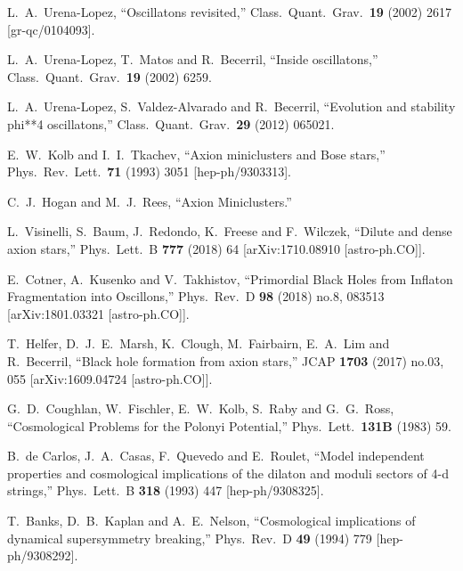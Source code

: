 \documentclass[11pt,a4paper]{article}
\begin{document}
\begin{thebibliography}{99}
  L.~A.~Urena-Lopez,
  ``Oscillatons revisited,''
  Class.\ Quant.\ Grav.\  {\bf 19} (2002) 2617
  [gr-qc/0104093].
  
  L.~A.~Urena-Lopez, T.~Matos and R.~Becerril,
  ``Inside oscillatons,''
  Class.\ Quant.\ Grav.\  {\bf 19} (2002) 6259.
  
  L.~A.~Urena-Lopez, S.~Valdez-Alvarado and R.~Becerril,
  ``Evolution and stability phi**4 oscillatons,''
  Class.\ Quant.\ Grav.\  {\bf 29} (2012) 065021.
  
  E.~W.~Kolb and I.~I.~Tkachev,
  ``Axion miniclusters and Bose stars,''
  Phys.\ Rev.\ Lett.\  {\bf 71} (1993) 3051
  [hep-ph/9303313].

  C.~J.~Hogan and M.~J.~Rees,
  ``Axion Miniclusters.''
  
  L.~Visinelli, S.~Baum, J.~Redondo, K.~Freese and F.~Wilczek,
  ``Dilute and dense axion stars,''
  Phys.\ Lett.\ B {\bf 777} (2018) 64
  [arXiv:1710.08910 [astro-ph.CO]].
  
  E.~Cotner, A.~Kusenko and V.~Takhistov,
  ``Primordial Black Holes from Inflaton Fragmentation into Oscillons,''
  Phys.\ Rev.\ D {\bf 98} (2018) no.8,  083513
  [arXiv:1801.03321 [astro-ph.CO]].  
  
  T.~Helfer, D.~J.~E.~Marsh, K.~Clough, M.~Fairbairn, E.~A.~Lim and R.~Becerril,
  ``Black hole formation from axion stars,''
  JCAP {\bf 1703} (2017) no.03,  055
  [arXiv:1609.04724 [astro-ph.CO]].
  
  G.~D.~Coughlan, W.~Fischler, E.~W.~Kolb, S.~Raby and G.~G.~Ross,
  ``Cosmological Problems for the Polonyi Potential,''
  Phys.\ Lett.\  {\bf 131B} (1983) 59.
  
  B.~de Carlos, J.~A.~Casas, F.~Quevedo and E.~Roulet,
  ``Model independent properties and cosmological implications of the dilaton and moduli sectors of 4-d strings,''
  Phys.\ Lett.\ B {\bf 318} (1993) 447
  [hep-ph/9308325].  
  
  T.~Banks, D.~B.~Kaplan and A.~E.~Nelson,
  ``Cosmological implications of dynamical supersymmetry breaking,''
  Phys.\ Rev.\ D {\bf 49} (1994) 779
  [hep-ph/9308292].
  

\end{thebibliography}
\end{document}
